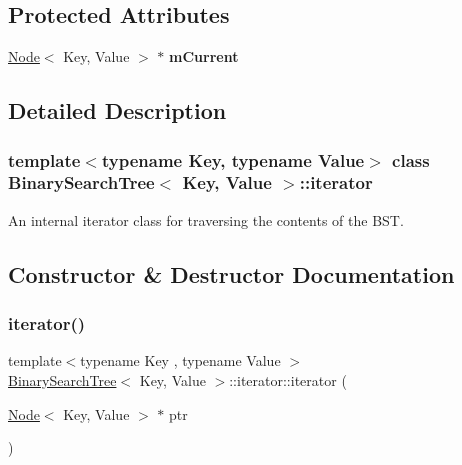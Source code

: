 \subsection*{Protected Attributes}
\begin{DoxyCompactItemize}
\item 
\mbox{\label{classBinarySearchTree_1_1iterator_a2f3115c3d4accda5f09629bf74391243}} 
\mbox{\hyperlink{classNode}{Node}}$<$ Key, Value $>$ $\ast$ {\bfseries m\+Current}
\end{DoxyCompactItemize}


\subsection{Detailed Description}
\subsubsection*{template$<$typename Key, typename Value$>$\newline
class Binary\+Search\+Tree$<$ Key, Value $>$\+::iterator}

An internal iterator class for traversing the contents of the B\+ST. 

\subsection{Constructor \& Destructor Documentation}
\mbox{\label{classBinarySearchTree_1_1iterator_ad2d047d6e1fda6f9e74a568fd0539d34}} 
\subsubsection{\texorpdfstring{iterator()}{iterator()}\hspace{0.1cm}{\footnotesize\ttfamily [1/2]}}
{\footnotesize\ttfamily template$<$typename Key , typename Value $>$ \\
\mbox{\hyperlink{classBinarySearchTree}{Binary\+Search\+Tree}}$<$ Key, Value $>$\+::iterator\+::iterator (\begin{DoxyParamCaption}\item[{\mbox{\hyperlink{classNode}{Node}}$<$ Key, Value $>$ $\ast$}]{ptr }\end{DoxyParamCaption})}

